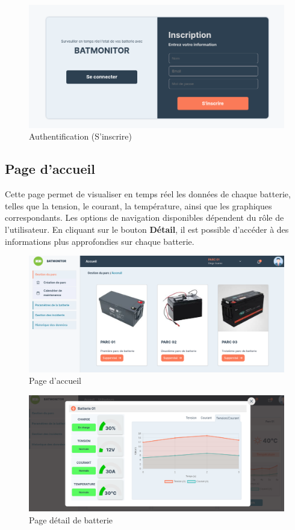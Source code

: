 \begin{figure}[H]
	\centering
	\includegraphics[width=17cm]{./img/interface/singup.png}
	\caption{Authentification (S'inscrire)}
	\label{fig:relais_5vdc}
\end{figure}

\subsection{Page d'accueil}

Cette page permet de visualiser en temps réel les données de chaque batterie, telles que la tension, le courant, la température, ainsi que les graphiques correspondants. Les options de navigation disponibles dépendent du rôle de l'utilisateur. En cliquant sur le bouton \textbf{Détail}, il est possible d'accéder à des informations plus approfondies sur chaque batterie.

\begin{figure}[H]
	\centering
	\includegraphics[width=17cm]{./img/Interfaces/acceuil.png}
	\caption{Page d'accueil}
	\label{fig:relais_5vdc}
\end{figure}

\begin{figure}[H]
	\centering
	\includegraphics[width=17cm]{./img/interface/detailAcceuil.png}
	\caption{Page détail de batterie}
	\label{fig:relais_5vdc}
\end{figure}

